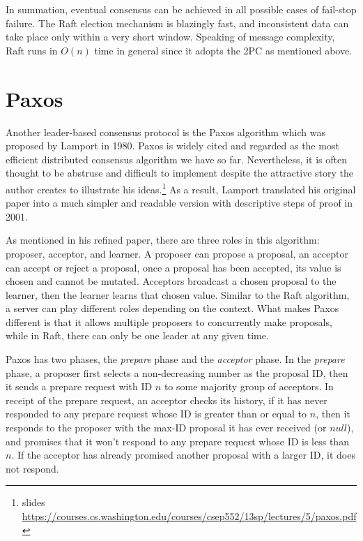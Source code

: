 \documentclass[11pt]{article}
\begin{document}
    In summation, eventual consensus can be achieved in all possible cases of fail-stop failure. The Raft election mechanism is blazingly fast, and inconsistent data can take place only within a very short window. Speaking of message complexity, Raft runs in $O(n)$ time in general since it adopts the \small{2PC} \normalsize as mentioned above.

  \section{Paxos}
    Another leader-based consensus protocol is the Paxos algorithm which was proposed by Lamport in 1980\autocite{paxos}. Paxos is widely cited and regarded as the most efficient distributed consensus algorithm we have so far. Nevertheless, it is often thought to be abstruse and difficult to implement despite the attractive story the author creates to illustrate his ideas.\footnote{\label{}slides \url{https://courses.cs.washington.edu/courses/csep552/13sp/lectures/5/paxos.pdf}} As a result, Lamport translated his original paper into a much simpler and readable version with descriptive steps of proof in 2001.\autocite{paxos2001}

    As mentioned in his refined paper, there are three roles in this algorithm: proposer, acceptor, and learner. A proposer can propose a proposal, an acceptor can accept or reject a proposal, once a proposal has been accepted, its value is chosen and cannot be mutated. Acceptors broadcast a chosen proposal to the learner, then the learner learns that chosen value. Similar to the Raft algorithm, a server can play different roles depending on the context. What makes Paxos different is that it allows multiple proposers to concurrently make proposals, while in Raft, there can only be one leader at any given time.

    Paxos has two phases, the \textit{prepare} phase and the \textit{acceptor} phase. In the \textit{prepare} phase, a proposer first selects a non-decreasing number as the proposal \small{ID}\normalsize, then it sends a prepare request with \small{ID} \normalsize $n$ to some majority group of acceptors. In receipt of the prepare request, an acceptor checks its history, if it has never responded to any prepare request whose \small{ID} \normalsize is greater than or equal to $n$, then it responds to the proposer with the max-\small{ID} \normalsize proposal it has ever received (or $null$), and promises that it won't respond to any prepare request whose \small{ID} \normalsize is less than $n$. If the acceptor has already promised another proposal with a larger \small{ID}\normalsize, it does not respond.
\end{document}
